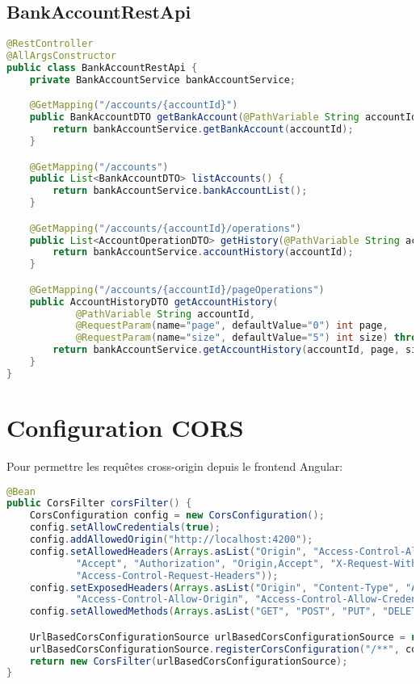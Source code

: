 \documentclass[12pt,a4paper]{report}
\begin{document}
\subsection{BankAccountRestApi}
\begin{lstlisting}[language=Java, caption=BankAccountRestApi.java]
@RestController
@AllArgsConstructor
public class BankAccountRestApi {
    private BankAccountService bankAccountService;

    @GetMapping("/accounts/{accountId}")
    public BankAccountDTO getBankAccount(@PathVariable String accountId) throws BankAccountNotFoundException {
        return bankAccountService.getBankAccount(accountId);
    }

    @GetMapping("/accounts")
    public List<BankAccountDTO> listAccounts() {
        return bankAccountService.bankAccountList();
    }

    @GetMapping("/accounts/{accountId}/operations")
    public List<AccountOperationDTO> getHistory(@PathVariable String accountId) {
        return bankAccountService.accountHistory(accountId);
    }

    @GetMapping("/accounts/{accountId}/pageOperations")
    public AccountHistoryDTO getAccountHistory(
            @PathVariable String accountId,
            @RequestParam(name="page", defaultValue="0") int page,
            @RequestParam(name="size", defaultValue="5") int size) throws BankAccountNotFoundException {
        return bankAccountService.getAccountHistory(accountId, page, size);
    }
}
\end{lstlisting}

\section{Configuration CORS}
Pour permettre les requêtes cross-origin depuis le frontend Angular:

\begin{lstlisting}[language=Java, caption=Configuration CORS]
@Bean
public CorsFilter corsFilter() {
    CorsConfiguration config = new CorsConfiguration();
    config.setAllowCredentials(true);
    config.addAllowedOrigin("http://localhost:4200");
    config.setAllowedHeaders(Arrays.asList("Origin", "Access-Control-Allow-Origin", "Content-Type",
            "Accept", "Authorization", "Origin,Accept", "X-Request-With", "Access-Control-Request-Method",
            "Access-Control-Request-Headers"));
    config.setExposedHeaders(Arrays.asList("Origin", "Content-Type", "Accept", "Authorization", "Access-Control-Allow-Origin",
            "Access-Control-Allow-Origin", "Access-Control-Allow-Credentials"));
    config.setAllowedMethods(Arrays.asList("GET", "POST", "PUT", "DELETE", "OPTIONS"));

    UrlBasedCorsConfigurationSource urlBasedCorsConfigurationSource = new UrlBasedCorsConfigurationSource();
    urlBasedCorsConfigurationSource.registerCorsConfiguration("/**", config);
    return new CorsFilter(urlBasedCorsConfigurationSource);
}
\end{lstlisting}
\end{document}
